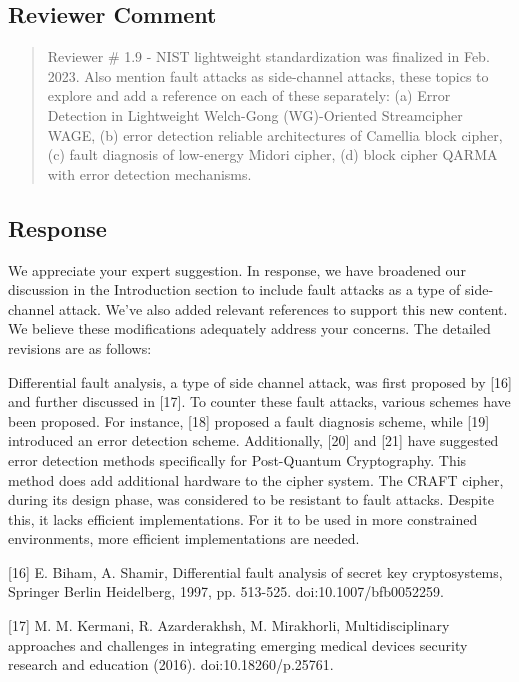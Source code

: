 \subsection{Reviewer Comment}
\begin{mdframed}
	\begin{quote}
		Reviewer \# 1.9 - NIST lightweight standardization was finalized in Feb. 2023. Also mention fault attacks as side-channel attacks, these topics to explore and add a reference on each of these separately: (a) Error Detection in Lightweight Welch-Gong (WG)-Oriented Streamcipher WAGE, (b) error detection reliable architectures of Camellia block cipher, (c) fault diagnosis of low-energy Midori cipher, (d) block cipher QARMA with error detection mechanisms.
	\end{quote}
\end{mdframed}

\subsection{Response}

We appreciate your expert suggestion. In response, we have broadened our discussion in the Introduction section to include fault attacks as a type of side-channel attack. We've also added relevant references to support this new content. We believe these modifications adequately address your concerns. The detailed revisions are as follows:

\color{blue}

Differential fault analysis, a type of side channel attack, was first proposed by [16] and further discussed in [17]. To counter these fault attacks, various schemes have been proposed. For instance, [18] proposed a fault diagnosis scheme, while [19] introduced an error detection scheme. Additionally, [20] and [21] have suggested error detection methods specifically for Post-Quantum Cryptography. This method does add additional hardware to the cipher system. The CRAFT cipher, during its design phase, was considered to be resistant to fault attacks. Despite this, it lacks efficient implementations. For it to be used in more constrained environments, more efficient implementations are needed.

[16] E. Biham, A. Shamir, Differential fault analysis of secret key cryptosystems, Springer Berlin Heidelberg, 1997, pp. 513-525. doi:10.1007/bfb0052259.


[17] M. M. Kermani, R. Azarderakhsh, M. Mirakhorli, Multidisciplinary approaches and challenges in integrating emerging medical devices security research and education (2016). \linebreak doi:10.18260/p.25761.


